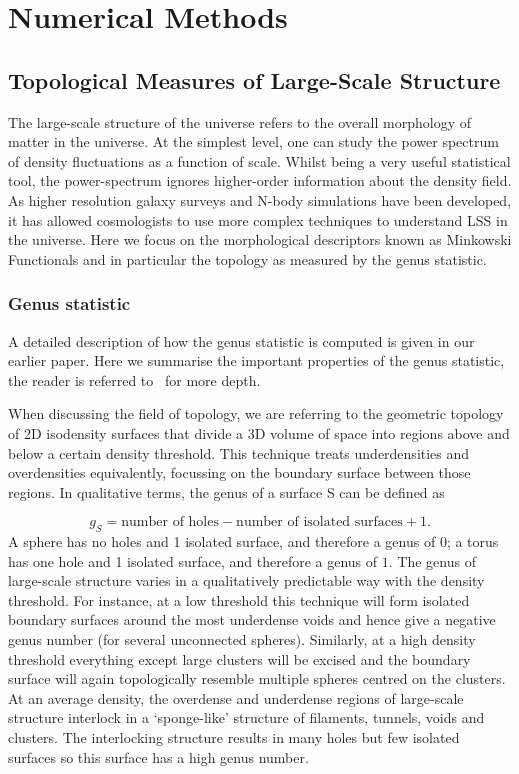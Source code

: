 \documentclass[a4paper,fleqn,usenatbib]{mnras}
\begin{document}

\section{Numerical Methods}
\label{sec:method}
\subsection{Topological Measures of Large-Scale Structure}

The large-scale structure of the universe refers to the overall morphology of matter in the universe. At the simplest level, one can study the power spectrum of density fluctuations as a function of scale. Whilst being a very useful statistical tool, the power-spectrum ignores higher-order information about the density field. As higher resolution galaxy surveys and N-body simulations have been developed, it has allowed cosmologists to use more complex techniques to understand LSS in the universe. Here we focus on the morphological descriptors known as Minkowski Functionals and in particular the topology as measured by the genus statistic.

\subsubsection{Genus statistic}

A detailed description of how the genus statistic is computed is given in our earlier paper. Here we summarise the important properties of the genus statistic, the reader is referred to~\citet{2017MNRAS.468...59W} for more depth.

When discussing the field of topology, we are referring to the geometric topology of 2D isodensity surfaces that divide a 3D volume of space into regions above and below a certain density threshold. This technique treats underdensities and overdensities equivalently, focussing on the boundary surface between those regions. In qualitative terms, the genus of a surface S can be defined as
 
\begin{equation}
\label{genusdef}
g_S = \text{number of holes} - \text{number of isolated surfaces} + 1. 
\end{equation}
A sphere has no holes and 1 isolated surface, and therefore a genus of $0$; a torus has one hole and 1 isolated surface, and therefore a genus of $1$. The genus of large-scale structure varies in a qualitatively predictable way with the density threshold. For instance, at a low threshold this technique will form isolated boundary surfaces around the most underdense voids and hence give a negative genus number (for several unconnected spheres). Similarly, at a high density threshold everything except large clusters will be excised and the boundary surface will again topologically resemble multiple spheres centred on the clusters. At an average density, the overdense and underdense regions of large-scale structure interlock in a `sponge-like' structure of filaments, tunnels, voids and clusters. The interlocking structure results in many holes but few isolated surfaces so this surface has a high genus number.
\end{document}
